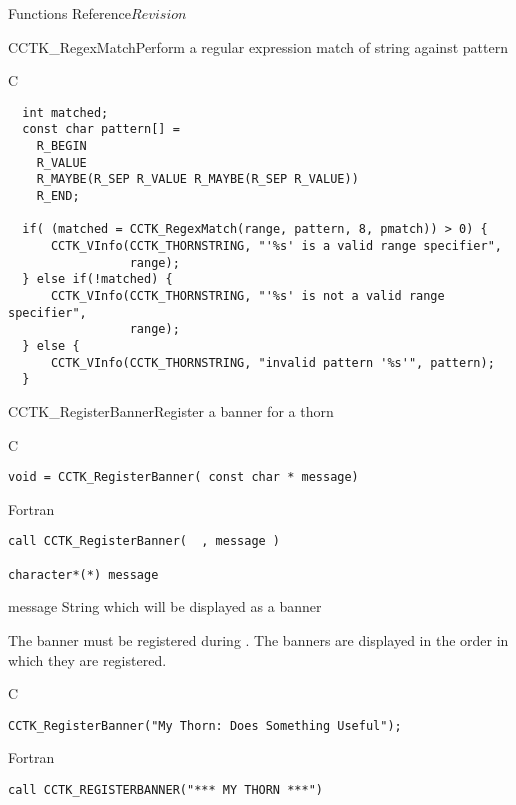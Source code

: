 \begin{cactuspart}{ Functions Reference}{}{$Revision$}
\begin{FunctionDescription}{CCTK\_RegexMatch}{Perform a regular expression match of string against pattern}
\begin{ExampleSection}
\begin{Example}{C}
\begin{verbatim}
  int matched;
  const char pattern[] =
    R_BEGIN
    R_VALUE
    R_MAYBE(R_SEP R_VALUE R_MAYBE(R_SEP R_VALUE))
    R_END;

  if( (matched = CCTK_RegexMatch(range, pattern, 8, pmatch)) > 0) {
      CCTK_VInfo(CCTK_THORNSTRING, "'%s' is a valid range specifier",
                 range);
  } else if(!matched) {
      CCTK_VInfo(CCTK_THORNSTRING, "'%s' is not a valid range specifier",
                 range);
  } else {
      CCTK_VInfo(CCTK_THORNSTRING, "invalid pattern '%s'", pattern);
  }
\end{verbatim}
\end{Example}
\end{ExampleSection}
\end{FunctionDescription}

\begin{FunctionDescription}{CCTK\_RegisterBanner}{Register a banner for a thorn}
\label{CCTK-RegisterBanner}
\begin{SynopsisSection}
\begin{Synopsis}{C}
\begin{verbatim}void = CCTK_RegisterBanner( const char * message)\end{verbatim}
\end{Synopsis}
\begin{Synopsis}{Fortran}
\begin{verbatim}call CCTK_RegisterBanner(  , message )

character*(*) message\end{verbatim}
\end{Synopsis}
\end{SynopsisSection}
\begin{ParameterSection}
\begin{Parameter}{message}
String which will be displayed as a banner
\end{Parameter}
\end{ParameterSection}
\begin{Discussion}
The banner must be registered during . The banners are
displayed in the order in which they are registered.
\end{Discussion}
\begin{ExampleSection}
\begin{Example}{C}
\begin{verbatim}
CCTK_RegisterBanner("My Thorn: Does Something Useful");
\end{verbatim}
\end{Example}
\begin{Example}{Fortran}
\begin{verbatim}
call CCTK_REGISTERBANNER("*** MY THORN ***")
\end{verbatim}
\end{Example}
\end{ExampleSection}
\end{FunctionDescription}


\end{cactuspart}
